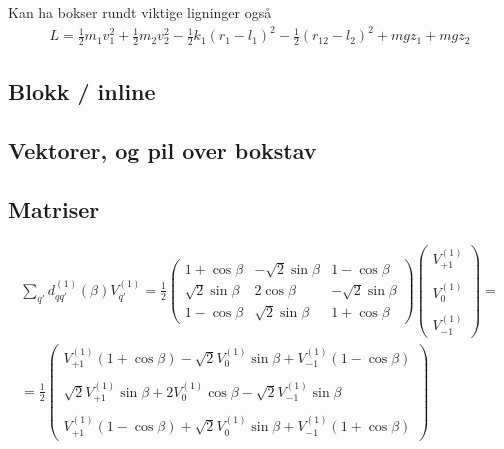             
        Kan ha bokser rundt viktige ligninger også
        \begin{align}
            \boxed{L = \frac{1}{2}m_1v_1^2 + \frac{1}{2}m_2v_2^2 
            - \frac{1}{2}k_1(r_1 - l_1)^2 - \frac{1}{2}(r_{12}-l_2)^2 + mgz_1 + mgz_2}
        \end{align}
            
            \subsection{Blokk / inline}
            
            \subsection{Vektorer, og pil over bokstav}
            
            \subsection{Matriser}
            
        \begin{align*}
            \sum_{q'}d_{qq'}^{(1)}(\beta)V_{q'}^{(1)} = \frac{1}{2}\begin{pmatrix}1+\cos\beta & -\sqrt{2}\sin\beta & 1-\cos\beta \\ \sqrt{2}\sin\beta & 2\cos\beta & -\sqrt{2}\sin\beta \\ 1-\cos\beta & \sqrt{2}\sin\beta & 1+\cos\beta \end{pmatrix}\begin{pmatrix} V_{+1}^{(1)} \\ \\ V_{0}^{(1)} \\ \\ V_{-1}^{(1)}\end{pmatrix} = \\ =
            \frac{1}{2}\begin{pmatrix}V_{+1}^{(1)}(1+\cos\beta) -\sqrt{2}V_0^{(1)}\sin\beta + V_{-1}^{(1)}(1-\cos\beta) \\ \\ \sqrt{2}V_{+1}^{(1)}\sin\beta + 2V_0^{(1)}\cos\beta -\sqrt{2}V_{-1}^{(1)}\sin\beta \\ \\ V_{+1}^{(1)}(1-\cos\beta) + \sqrt{2}V_0^{(1)}\sin\beta + V_{-1}^{(1)}(1+\cos\beta) \end{pmatrix}
        \end{align*}
    
